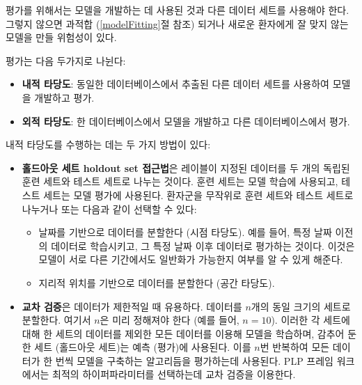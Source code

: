 \documentclass[10.5pt]{book}
\providecommand{\tightlist}{%
  \setlength{\itemsep}{0pt}\setlength{\parskip}{0pt}}
\theoremstyle{definition}
\theoremstyle{definition}
\theoremstyle{definition}
\theoremstyle{remark}
\let\BeginKnitrBlock\begin \let\EndKnitrBlock\end
\begin{document}
\BeginKnitrBlock{rmdimportant}
평가를 위해서는 모델을 개발하는 데 사용된 것과 다른 데이터 세트를
사용해야 한다. 그렇지 않으면 과적합 (\ref{modelFitting}절 참조) 되거나
새로운 환자에게 잘 맞지 않는 모델을 만들 위험성이 있다.
\EndKnitrBlock{rmdimportant}

평가는 다음 두가지로 나뉜다:

\begin{itemize}
\tightlist
\item
  \textbf{내적 타당도}: 동일한 데이터베이스에서 추출된 다른 데이터
  세트를 사용하여 모델을 개발하고 평가.
\item
  \textbf{외적 타당도}: 한 데이터베이스에서 모델을 개발하고 다른
  데이터베이스에서 평가. 
\end{itemize}

내적 타당도를 수행하는 데는 두 가지 방법이 있다:

\begin{itemize}
\tightlist
\item
  \textbf{홀드아웃 세트 holdout set 접근법}은 레이블이 지정된 데이터를
  두 개의 독립된 훈련 세트와 테스트 세트로 나누는 것이다. 훈련 세트는
  모델 학습에 사용되고, 테스트 세트는 모델 평가에 사용된다. 환자군을
  무작위로 훈련 세트와 테스트 세트로 나누거나 또는 다음과 같이 선택할 수
  있다:

  \begin{itemize}
  \tightlist
  \item
    날짜를 기반으로 데이터를 분할한다 (시점 타당도). 예를 들어, 특정
    날짜 이전의 데이터로 학습시키고, 그 특정 날짜 이후 데이터로 평가하는
    것이다. 이것은 모델이 서로 다른 기간에서도 일반화가 가능한지 여부를
    알 수 있게 해준다. 
  \item
    지리적 위치를 기반으로 데이터를 분할한다 (공간 타당도).
  \end{itemize}
\item
  \textbf{교차 검증}은 데이터가 제한적일 때 유용하다. 데이터를 \(n\)개의
  동일 크기의 세트로 분할한다. 여기서 \(n\)은 미리 정해져야 한다 (예를
  들어, \(n=10\)). 이러한 각 세트에 대해 한 세트의 데이터를 제외한 모든
  데이터를 이용해 모델을 학습하며, 감추어 둔 한 세트 (홀드아웃 세트)는
  예측 (평가)에 사용된다. 이를 \(n\)번 반복하여 모든 데이터가 한 번씩
  모델을 구축하는 알고리듬을 평가하는데 사용된다. PLP 프레임 워크에서는
  최적의 하이퍼파라미터를 선택하는데 교차 검증을 이용한다.
\end{itemize}
\end{document}
